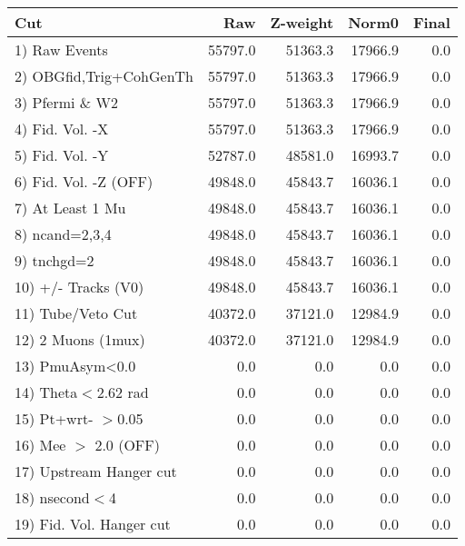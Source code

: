  \begin{table}[h!]\centering
 \begin{tabular}{||l||r|r|r|r||}
 \hline
 \hline
 Cut & Raw & Z-weight & Norm0 & Final \\
 \hline
  1) Raw Events           &     55797.0 &     51363.3 &     17966.9 &         0.0 \\
  2) OBGfid,Trig+CohGenTh &     55797.0 &     51363.3 &     17966.9 &         0.0 \\
  3) Pfermi \& W2         &     55797.0 &     51363.3 &     17966.9 &         0.0 \\
  4) Fid. Vol. -X         &     55797.0 &     51363.3 &     17966.9 &         0.0 \\
  5) Fid. Vol. -Y         &     52787.0 &     48581.0 &     16993.7 &         0.0 \\
  6) Fid. Vol. -Z (OFF)   &     49848.0 &     45843.7 &     16036.1 &         0.0 \\
  7) At Least 1 Mu        &     49848.0 &     45843.7 &     16036.1 &         0.0 \\
  8) ncand=2,3,4          &     49848.0 &     45843.7 &     16036.1 &         0.0 \\
  9) tnchgd=2             &     49848.0 &     45843.7 &     16036.1 &         0.0 \\
 10) +/- Tracks (V0)      &     49848.0 &     45843.7 &     16036.1 &         0.0 \\
 11) Tube/Veto Cut        &     40372.0 &     37121.0 &     12984.9 &         0.0 \\
 12) 2 Muons (1mux)       &     40372.0 &     37121.0 &     12984.9 &         0.0 \\
 13) PmuAsym<0.0          &         0.0 &         0.0 &         0.0 &         0.0 \\
 14) Theta$<$2.62 rad     &         0.0 &         0.0 &         0.0 &         0.0 \\
 15) Pt+wrt- $>$0.05      &         0.0 &         0.0 &         0.0 &         0.0 \\
 16) Mee $>$ 2.0  (OFF)   &         0.0 &         0.0 &         0.0 &         0.0 \\
 17) Upstream Hanger cut  &         0.0 &         0.0 &         0.0 &         0.0 \\
 18) nsecond$<$4          &         0.0 &         0.0 &         0.0 &         0.0 \\
 19) Fid. Vol. Hanger cut &         0.0 &         0.0 &         0.0 &         0.0 \\

\end{tabular}
\end{table}

